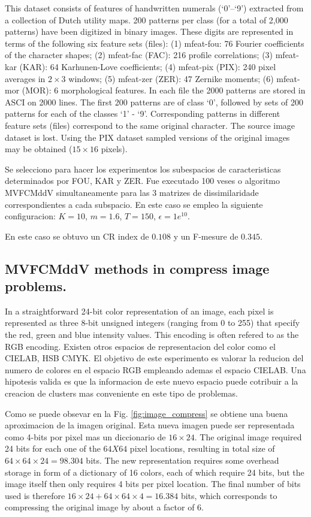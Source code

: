 \documentclass[12pt]{article}
\begin{document}
This dataset consists of features of handwritten numerals (`0'--`9') extracted from a collection of Dutch utility maps. 200 patterns per class (for a total of 2,000 patterns) have been digitized in binary images. These digits are represented in terms of the following six feature sets (files): (1) mfeat-fou: 76 Fourier coefficients of the character shapes; (2) mfeat-fac (FAC): 216 profile correlations; (3) mfeat-kar (KAR): 64 Karhunen-Love coefficients; (4) mfeat-pix (PIX): 240 pixel averages in $2 \times 3$ windows; (5) mfeat-zer (ZER): 47 Zernike moments; (6) mfeat-mor (MOR): 6 morphological features. In each file the 2000 patterns are stored in ASCI on 2000 lines. The first 200 patterns are of class `0', followed by sets of 200 patterns for each of the classes `1' - `9'. Corresponding patterns in different feature sets (files) correspond to the same original character. The source image dataset is lost. Using the PIX dataset sampled versions of the original images may be obtained ($15 \times 16$ pixels).

Se selecciono para hacer los experimentos los subespacios de caracteristicas determinados por FOU, KAR y ZER. Fue executado 100 veses o algoritmo MVFCMddV simultaneamente para las 3 matrizes de dissimilaridade correspondientes a cada subspacio. En este caso se empleo la siguiente configuracion: $K =10$, $m = 1.6$, $T = 150$, $\epsilon = 1e^{10}$.

En este caso se obtuvo un CR index de $0.108$ y un F-mesure de $0.345$. 




\subsection{MVFCMddV methods in compress image problems.}

In a straightforward 24-bit color representation of an image, each pixel is represented as three 8-bit unsigned integers (ranging from 0 to 255) that specify the red, green and blue intensity values. This encoding is often refered to as the RGB encoding. Existen otros espacios de representacion del color como el CIELAB, HSB CMYK. El objetivo de este esperimento es valorar la reducion del numero de colores en el espacio RGB empleando ademas el espacio CIELAB. Una hipotesis valida es que la informacion de este nuevo espacio puede cotribuir a la creacion de clusters mas conveniente en este tipo de problemas.  

Como se puede obsevar en la Fig. \ref{fig:image_compress} se obtiene una buena aproximacion de la imagen original. Esta nueva imagen puede ser representada como 4-bits por pixel mas un diccionario de $16\times24$. The original image required 24 bits for each one of the $64X64$ pixel locations, resulting in total size of $64\times64\times24 = 98.304$ bits. The new representation requires some overhead storage in form of a dictionary of 16 colors, each of which require 24 bits, but the image itself then only requires 4 bits per pixel location. The final number of bits used is therefore $16\times24 + 64\times64\times4 = 16.384$ bits, which corresponds to compressing the original image by about a factor of 6.
\end{document}
